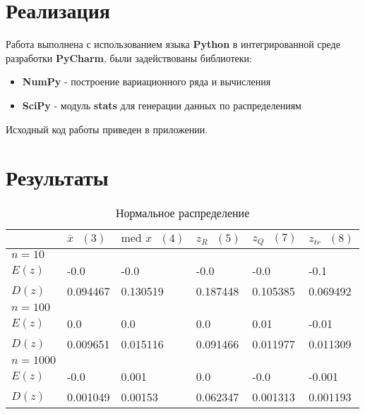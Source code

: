 \documentclass[12pt,a4paper]{article}
\begin{document}
\pagebreak

\section{Реализация}
Работа выполнена с использованием языка \textbf{Python} в интегрированной среде разработки \textbf{PyCharm}, были задействованы библиотеки:

\begin{itemize}
	\item \textbf{NumPy} - построение вариационного ряда и вычисления
	\item \textbf{SciPy} - модуль \textbf{stats} для генерации данных по распределениям
\end{itemize}

Исходный код работы приведен в приложении. 
\pagebreak

\section{Результаты}

\begin{table}[h!]
	\centering
	\begin{tabular}{|l|l|l|l|l|l|}
		\hline&$\bar x\text{	} \hyperref[3]{(3)}$ &$\text{med }x\text{	} \hyperref[4]{(4)}$  &$z_R\text{	} \hyperref[5]{(5)}$  &$z_Q\text{	} \hyperref[7]{(7)}$  &$z_{tr}\text{	} \hyperref[8]{(8)}$  \\ \hline
		$n=10$&&&&& \\ \hline$E(z)$&-0.0&-0.0&-0.0&-0.0&-0.1 \\ \hline$D(z)$&0.094467&0.130519&0.187448&0.105385&0.069492 \\ \hline
		
		$n=100$&&&&& \\ \hline$E(z)$&0.0&0.0&0.0&0.01&-0.01 \\ \hline$D(z)$&0.009651&0.015116&0.091466&0.011977&0.011309 \\ \hline
		
		$n=1000$&&&&& \\ \hline$E(z)$&-0.0&0.001&0.0&-0.0&-0.001 \\ \hline$D(z)$&0.001049&0.00153&0.062347&0.001313&0.001193 \\ \hline
		
	\end{tabular}
	\caption{Нормальное распределение}
\end{table}
\end{document}

